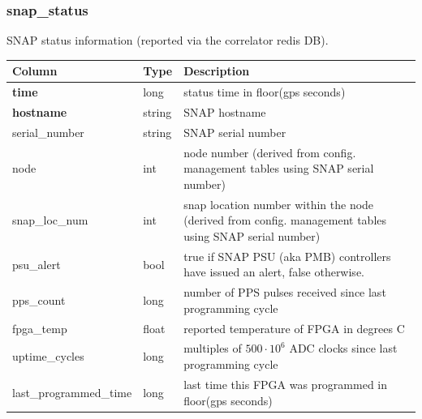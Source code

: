\documentclass{article}
\begin{document}
{\subsubsection{snap\_status}
SNAP status information (reported via the correlator redis DB).
\begin{center}
 \begin{tabular}{| p{4cm} | p{2cm} | p{10cm} |}
\hline
 {\bf Column} & {\bf Type}  & {\bf Description} \\ [0.5ex]  \hline\hline
\textbf{time} & long & status time in floor(gps seconds)\\ \hline
\textbf{hostname} & string & SNAP hostname \\ \hline
serial\_number & string & SNAP serial number \\ \hline
node & int & node number (derived from config. management tables using SNAP serial number) \\ \hline
snap\_loc\_num & int & snap location number within the node (derived from config. management tables using SNAP serial number) \\ \hline
psu\_alert & bool & true if SNAP PSU (aka PMB) controllers have issued an alert, false otherwise. \\ \hline
pps\_count & long & number of PPS pulses received since last programming cycle \\\hline
fpga\_temp & float & reported temperature of FPGA  in degrees C \\\hline
uptime\_cycles & long & multiples of $500\cdot 10^6$ ADC clocks since last programming cycle \\\hline
last\_programmed\_time & long & last time this FPGA was programmed in floor(gps seconds)\\\hline
\end{tabular}
\end{center}

}
\end{document}
